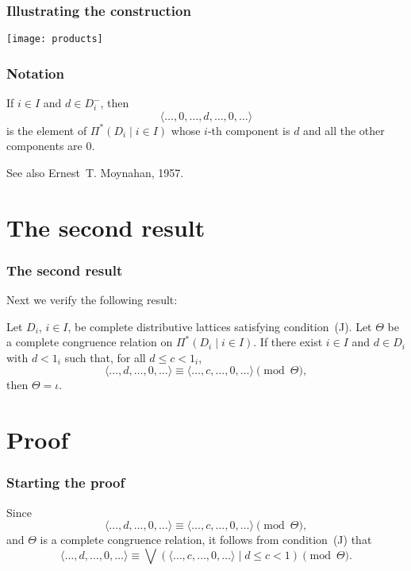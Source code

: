 \documentclass{beamer}
\begin{document}
\begin{frame}
\frametitle{Illustrating the construction}

\centering\texttt{[image: products]}
\end{frame}

\begin{frame}
\frametitle{Notation}

If $i \in I$ and $d \in D_{i}^{-}$, then
\[
  \langle \ldots, 0, \ldots, d, \ldots, 0, \ldots \rangle
\]
is the element of $\Pi^{*} ( D_{i} \mid i \in I )$ whose 
$i$-th component is $d$ and all the other components 
are $0$.

See also Ernest~T. Moynahan, 1957.
\end{frame}

\section[Second result]{The second result}

\begin{frame}
\frametitle{The second result}

Next we verify the following result:

\begin{theorem}
Let $D_{i}$, $i \in I$, be complete distributive 
lattices satisfying condition~\textup{(J)}.  
Let $\Theta$ be a complete congruence relation on 
$\Pi^{*} ( D_{i} \mid i \in I )$. 
If there exist $i \in I$ and $d \in D_{i}$ with 
$d < 1_{i}$ such that, for all $d \leq c < 1_{i}$, 
\begin{equation*}
   \langle \ldots, d, \ldots, 0, \ldots \rangle \equiv 
   \langle \ldots, c, \ldots, 0, \ldots \rangle 
   \pmod{\Theta}, 
\end{equation*}
then $\Theta = \iota$.
\end{theorem}
\end{frame}

\section{Proof}

\begin{frame}
\frametitle{Starting the proof}

Since 
\begin{equation*}
\langle \ldots, d, \ldots, 0, \ldots \rangle \equiv 
\langle \ldots, c, \ldots, 0, \ldots \rangle 
\pmod{\Theta}, 
\end{equation*}
and $\Theta$ is a complete congruence relation, 
it follows from condition~(J) that
\begin{equation*}
 \langle \ldots, d, \ldots, 0, \ldots \rangle \equiv
 \bigvee ( \langle \ldots, c, \ldots, 0, \ldots \rangle 
 \mid d \leq c < 1 ) \pmod{\Theta}. 
\end{equation*}
\end{frame}
\end{document}
